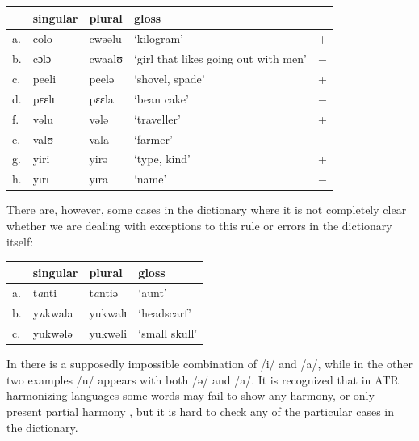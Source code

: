 \begin{exe}
    \ex \label{atr}
    \begin{tabular}[t]{lllll}
      & singular & plural & gloss                                &   \\
      \midrule
      a. & colo     & cwəəlu & `kilogram'                           & + \\
      b. & cɔlɔ     & cwaalʊ & `girl that likes going out with men' & $-$ \\
      c. & peeli    & peelə  & `shovel, spade'                      & + \\
      d. & pɛɛlɩ    & pɛɛla  & `bean cake'                          & $-$ \\
      f. & vəlu     & vələ   & `traveller'                          & + \\
      e. & valʊ     & vala   & `farmer'                             & $-$ \\
      g. & yiri     & yirə   & `type, kind'                         & + \\
      h. & yɩrɩ     & yɩra   & `name'                               & $-$ \\
    \end{tabular}
\end{exe}

There are, however, some cases in the dictionary where it is not completely clear whether we are dealing with exceptions to this rule or errors in the dictionary itself:

\begin{exe}
    \ex \label{atr-errors}
    \begin{tabular}[t]{llll}
      & singular         & plural          & gloss         \\
      \midrule
      a. & t\textit{a}nti   & t\textit{a}ntiə & `aunt'        \\
      b. & y\textit{u}kwala & yukwalɩ         & `headscarf'   \\
      c. & yukwələ          & yukwəli         & `small skull' \\
    \end{tabular}
\end{exe}

In  there is a supposedly impossible combination of /i/ and /a/, while in the other two examples /u/ appears with both /ə/ and /a/. It is recognized that in ATR harmonizing languages some words may fail to show any harmony, or only present partial harmony \autocite{Casali.2008}, but it is hard to check any of the particular cases in the dictionary.

